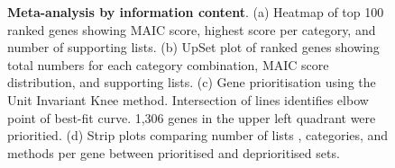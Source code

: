 \documentclass[
  11,
  a4paper,
]{article}
\begin{document}
\begin{figure}


\caption{\label{fig-fig1}\textbf{Meta-analysis by information content}.
(a) Heatmap of top 100 ranked genes showing MAIC score, highest score
per category, and number of supporting lists. (b) UpSet plot of ranked
genes showing total numbers for each category combination, MAIC score
distribution, and supporting lists. (c) Gene prioritisation using the
Unit Invariant Knee method. Intersection of lines identifies elbow point
of best-fit curve. 1,306 genes in the upper left quadrant were
prioritied. (d) Strip plots comparing number of lists , categories, and
methods per gene between prioritised and deprioritised sets.}

\end{figure}%
\end{document}

